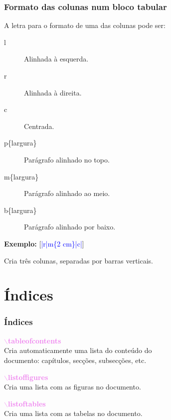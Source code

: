\documentclass{beamer}
\begin{document}
\begin{frame}
\frametitle{Formato das colunas num bloco tabular}
A letra para o formato de uma das colunas pode ser:\pause

\begin{description}
\item[\phantom{xxxxxxxxi}l] Alinhada à esquerda.\pause
\item[\phantom{xxxxxxxxi}r] Alinhada à direita.\pause
\item[\phantom{xxxxxxxxi}c] Centrada.\pause
\item[\phantom{i}p\{largura\}] Parágrafo alinhado no topo.\pause
\item[m\{largura\}] Parágrafo alinhado ao meio.\pause
\item[\phantom{i}b\{largura\}] Parágrafo alinhado por baixo.\pause
\end{description}

\textbf{Exemplo:} [\textcolor{blue}{|r|m\{2 cm\}|c|}]

Cria três colunas, separadas por barras verticais.

\end{frame}
\section{Índices}
\begin{frame}
\frametitle{Índices}
\textcolor{violet}{\bfseries $\backslash$tableofcontents}\\
\quad Cria automaticamente uma lista do conteúdo do\\
\quad documento: capítulos, secções, subsecções, etc.\pause

\textcolor{violet}{\bfseries $\backslash$listoffigures}\\
\quad Cria uma lista com as figuras no documento.\pause

\textcolor{violet}{\bfseries $\backslash$listoftables}\\
\quad Cria uma lista com as tabelas no documento.
\end{frame}
\end{document}
